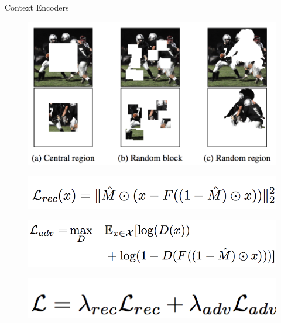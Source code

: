 \begin{frame}[allowframebreaks]{Context Encoders}
    \begin{figure}
        \flushleft
        \includegraphics[width=1\linewidth,height=\textheight,keepaspectratio]{images/ssl/slide_19_1_img.png}
    \end{figure}

    \framebreak

    \begin{figure}
        \flushleft
        \includegraphics[width=1\linewidth,height=\textheight,keepaspectratio]{images/ssl/slide_20_3_img.png}
    \end{figure}

    \begin{figure}
        \flushleft
        \includegraphics[width=1\linewidth,height=\textheight,keepaspectratio]{images/ssl/slide_20_2_img.png}
    \end{figure}

    \begin{figure}
        \centering
        \includegraphics[width=0.7\linewidth,height=\textheight,keepaspectratio]{images/ssl/slide_20_1_img.png}
    \end{figure}


\end{frame}
